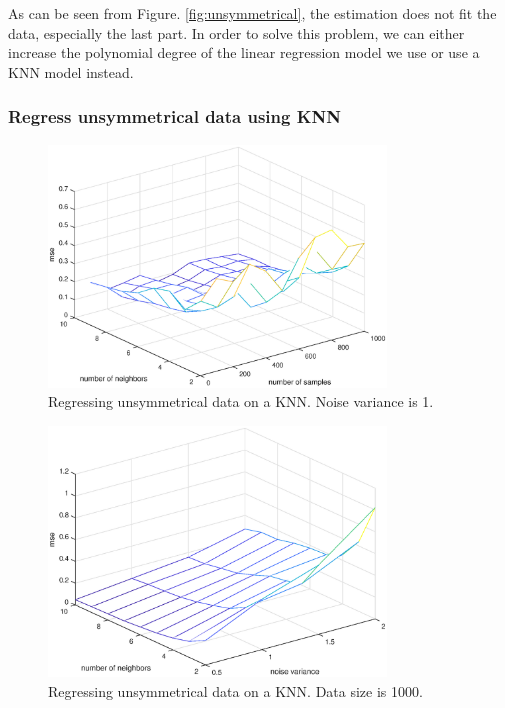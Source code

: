 \documentclass[]{article}
\begin{document}
As can be seen from Figure. \ref{fig:unsymmetrical}, the estimation does not fit the data, especially the last part. In order to solve this problem, we can either increase the polynomial degree of the linear regression model we use or use a KNN model instead.

\subsubsection{Regress unsymmetrical data using KNN}
\begin{figure}[H]
	\caption{Regressing unsymmetrical data on a KNN. Noise variance is 1.}
	\label{fig:unsymmetricalKNN1}
	\centering
	\includegraphics[width=0.8\textwidth]{project32d1}
\end{figure}

\begin{figure}[H]
	\caption{Regressing unsymmetrical data on a KNN. Data size is 1000.}
	\label{fig:unsymmetricalKNN2}
	\centering
	\includegraphics[width=0.8\textwidth]{project32d2}
\end{figure}
\end{document}
